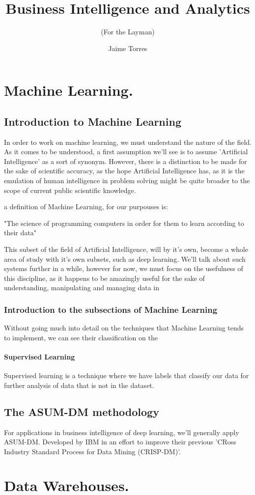 \documentclass{textbook}
\title     {Business Intelligence and Analytics}
\subtitle  {(For the Layman)}
\author    {Jaime Torres}
\begin{document}
\tableofcontents

\part{Machine Learning.}

\chapter{Introduction to Machine Learning}

In order to work on machine learning, we must understand the nature of the field. As it comes to be understood, a 
first assumption we'll see is to assume 'Artificial Intelligence' as a sort of synonym. However, there is a distinction
to be made for the sake of scientific accuracy, as the hope Artificial Intelligence has, as it is the emulation of human 
intelligence in problem solving might be quite broader to the scope of current public scientific knowledge. 

a definition of Machine Learning, for our purpouses is:

"The science of programming computers in order for them to learn according to their data"

This subset of the field of Artificial Intelligence, will by it's own, become a whole area of study with it's own subsets, such as 
deep learning. We'll talk about such systems further in a while, however for now, we must focus on the usefulness of this discipline, as 
it happens to be amazingly useful for the sake of understanding, manipulating and managing data in 

\section{Introduction to the subsections of Machine Learning}

Without going much into detail on the techniques that Machine Learning tends to implement, we can see their 
classification on the 

\subsection{Supervised Learning}

Supervised learning is a technique where we have labels that classify our data for further 
analysis of data that is not in the dataset.

\chapter{The ASUM-DM methodology}

For applications in business intelligence of deep learning, we'll generally apply
ASUM-DM. Developed by IBM in an effort to improve their previous 'CRoss
Industry Standard Process for Data Mining (CRISP-DM)'.   


\part{Data Warehouses.}
\end{document}
